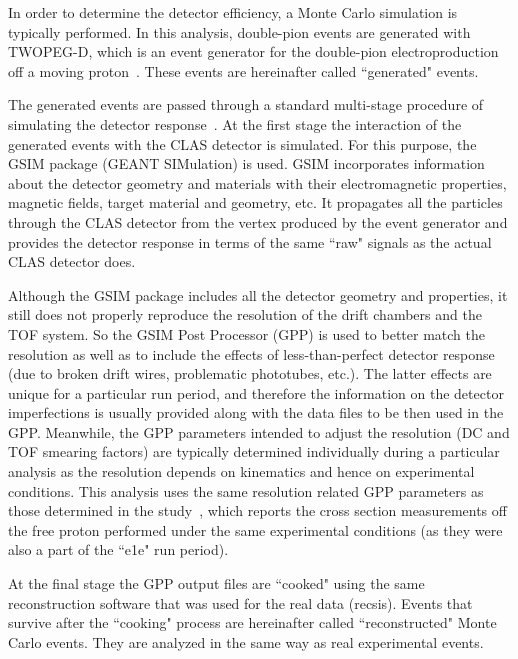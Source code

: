 In order to determine the detector efficiency, a Monte Carlo simulation is typically performed. In this analysis, double-pion events are generated with TWOPEG-D, which is an event generator for the double-pion electroproduction off a moving proton~\cite{twopeg-d}. These events are hereinafter called ``generated" events. 

The generated events are passed through a standard multi-stage procedure of simulating the detector response~\cite{Mecking:2003zu}. At the first stage the interaction of the generated events with the CLAS detector is simulated. For this purpose, the GSIM package (GEANT SIMulation) is used. GSIM incorporates information about the detector geometry and materials with their electromagnetic properties, magnetic fields, target material and geometry, etc. It  propagates all the particles through the CLAS detector from the vertex produced by the event generator and provides the detector response in terms of the same ``raw" signals as the actual CLAS detector does.

Although the GSIM package includes all the detector geometry and properties, it still does not properly reproduce the resolution of the drift chambers and the TOF system. So the GSIM Post Processor (GPP) is used to better match the resolution as well as to include the effects of less-than-perfect detector response (due to broken drift wires, problematic phototubes, etc.). The latter effects are unique for a particular run period, and therefore the information on the detector imperfections is usually provided along with the data files to be then used in the GPP. Meanwhile, the GPP parameters intended to adjust the resolution (DC and TOF smearing factors) are typically determined individually during a particular analysis as the resolution depends on kinematics and hence on experimental conditions. This analysis uses the same resolution related GPP parameters as those determined in the study~\cite{Fed_an_note:2017,Fed_paper_2018}, which reports the cross section measurements off the free proton performed under the same experimental conditions (as they were also a part of the ``e1e" run period). 



At the final stage the GPP output files are ``cooked" using the same reconstruction software that was used for the real data (recsis). Events that survive after the ``cooking" process are hereinafter called ``reconstructed" Monte Carlo events. They are analyzed in the same way as real experimental events. 



